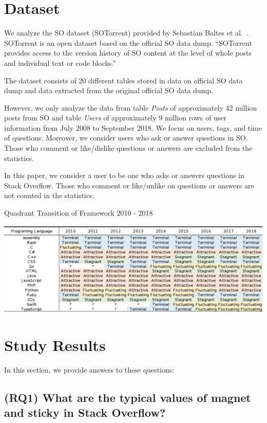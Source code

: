 \documentclass[english,preprint,JIP,technote]{ipsj}
\begin{document}
\section{Dataset}
We analyze the SO dataset (SOTorrent) provided by Sebastian Baltes et al.~\cite{msr2019challenge}. SOTorrent is an open dataset based on the official SO data dump. ``SOTorrent provides access to the version history of SO content at the level of whole posts and individual text or code blocks.''

The dataset consists of 20 different tables stored in data on official SO data dump and data extracted from the original official SO data dump.

However, we only analyze the data from table \emph{Posts} of approximately 42 million posts from SO and table \emph{Users} of approximately 9 million rows of user information from July 2008 to September 2018. We focus on  users, tags, and time of questions. Moreover, we consider users who ask or answer questions in SO. Those who comment or like/dislike questions or answers are excluded from the statistics.

In this paper, we consider a user to be one who asks or answers questions in Stack Overflow. Those who comment or like/unlike on questions or answers are not counted in the statistics.


\begin{table}[t]
 \centering
 \caption{Quadrant Transition of Framework 2010 - 2018} 
 \includegraphics[width=1.0\hsize]{img/frame2010-2018.eps} 
 \label{table1} 
\end{table}

\section{Study Results} %
In this section, we provide answers to these questions:

\subsection{(RQ1) What are the typical values of magnet and sticky in Stack Overflow?}
\end{document}
